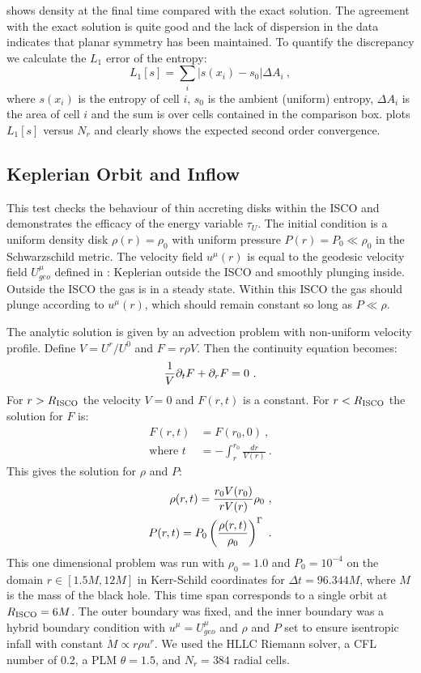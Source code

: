  shows density at the final time compared with the exact solution.  The agreement with the exact solution is quite good and the lack of dispersion in the data indicates that planar symmetry has been maintained.  To quantify the discrepancy we calculate the $L_1$ error of the entropy:
\begin{equation}
	L_1[s] = \sum_i |s(x_i)-s_0| \Delta A_i\ ,
\end{equation}
where $s(x_i)$ is the entropy of cell $i$, $s_0$ is the ambient (uniform) entropy, $\Delta A_i$ is the area of cell $i$ and the sum is over cells contained in the comparison box.   plots $L_1[s]$ versus $N_r$ and clearly shows the expected second order convergence.

\subsection{Keplerian Orbit and Inflow}

This test checks the behaviour of thin accreting disks within the ISCO and demonstrates the efficacy of the energy variable $\tau_U$.  The initial condition is a uniform density disk $\rho(r)=\rho_0$ with uniform pressure $P(r) = P_0 \ll \rho_0$ in the Schwarzschild metric.  The velocity field $u^\mu(r)$ is equal to the geodesic velocity field $U^\mu_{geo}$ defined in : Keplerian outside the ISCO and smoothly plunging inside.  Outside the ISCO the gas is in a steady state.  Within this ISCO the gas should plunge according to $u^\mu(r)$, which should remain constant so long as $P \ll \rho$.

The analytic solution is given by an advection problem with non-uniform velocity profile.  Define $V = U^r / U^0$ and $F = r \rho V$. Then the continuity equation becomes:
\begin{equation}
	\frac{1}{V}\partial_t F + \partial_r F = 0\ . \eqlabel{kep:adveq}
\end{equation}
For $r > R_{\rm ISCO}$ the velocity $V=0$ and $F(r,t)$ is a constant.  For $r < R_{\rm ISCO}$ the solution for $F$ is:
\begin{align}
	F(r,t) &= F(r_0, 0)\ , \\
	\text{where } t &= -\int_r^{r_0} \frac{dr}{V(r)}\ .
\end{align}
This gives the solution for $\rho$ and $P$:
\begin{align}
	\rho(r,t) = \frac{r_0 V(r_0)}{r V(r)} \rho_0 \ , \\
	P(r,t) = P_0 \left(\frac{\rho(r,t)}{\rho_0}\right)^\Gamma\ .
\end{align}
This one dimensional problem was run with $\rho_0 = 1.0$ and $P_0 = 10^{-4}$ on the domain $r\in[1.5M, 12M]$ in Kerr-Schild coordinates for $\Delta t = 96.344M$, where $M$ is the mass of the black hole.  This time span corresponds to a single orbit at $R_{\rm ISCO} = 6M$.  The outer boundary was fixed, and the inner boundary was a hybrid boundary condition with $u^\mu = U^\mu_{geo}$ and $\rho$ and $P$ set to ensure isentropic infall with constant $\dot{M} \propto r\rho u^r$. We used the HLLC Riemann solver, a CFL number of 0.2, a PLM $\theta=1.5$, and $N_r = 384$ radial cells.

